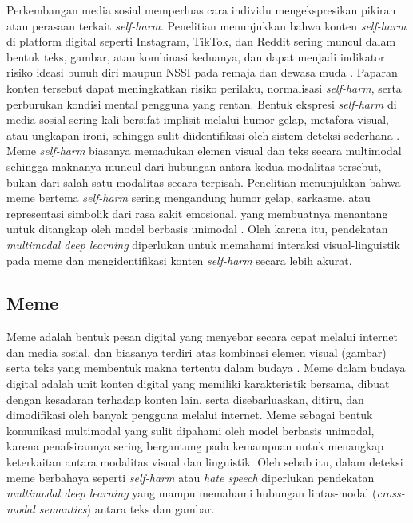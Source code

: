 Perkembangan media sosial memperluas cara individu mengekspresikan pikiran atau perasaan terkait \textit{self-harm}. Penelitian menunjukkan bahwa konten \textit{self-harm} di platform digital seperti Instagram, TikTok, dan Reddit sering muncul dalam bentuk teks, gambar, atau kombinasi keduanya, dan dapat menjadi indikator risiko ideasi bunuh diri maupun NSSI pada remaja dan dewasa muda \cite{arendt2019effects}. Paparan konten tersebut dapat meningkatkan risiko perilaku, normalisasi \textit{self-harm}, serta perburukan kondisi mental pengguna yang rentan. Bentuk ekspresi \textit{self-harm} di media sosial sering kali bersifat implisit melalui humor gelap, metafora visual, atau ungkapan ironi, sehingga sulit diidentifikasi oleh sistem deteksi sederhana \cite{Sharma2022HarmfulMemes}.
Meme \textit{self-harm} biasanya memadukan elemen visual dan teks secara multimodal sehingga maknanya muncul dari hubungan antara kedua modalitas tersebut, bukan dari salah satu modalitas secara terpisah. Penelitian menunjukkan bahwa meme bertema \textit{self-harm} sering mengandung humor gelap, sarkasme, atau representasi simbolik dari rasa sakit emosional, yang membuatnya menantang untuk ditangkap oleh model berbasis unimodal \cite{kiela2020hateful}. Oleh karena itu, pendekatan \textit{multimodal deep learning} diperlukan untuk memahami interaksi visual-linguistik pada meme dan mengidentifikasi konten \textit{self-harm} secara lebih akurat.

\subsection{Meme} \label{II.teori9}
Meme adalah bentuk pesan digital yang menyebar secara cepat melalui internet dan media sosial, dan biasanya terdiri atas kombinasi elemen visual (gambar) serta teks yang membentuk makna tertentu dalam budaya \cite{shifman2013memes}. Meme dalam budaya digital adalah unit konten digital yang memiliki karakteristik bersama, dibuat dengan kesadaran terhadap konten lain, serta disebarluaskan, ditiru, dan dimodifikasi oleh banyak pengguna melalui internet.  Meme sebagai bentuk komunikasi multimodal yang sulit dipahami oleh model berbasis unimodal, karena penafsirannya sering bergantung pada kemampuan untuk menangkap keterkaitan antara modalitas visual dan linguistik. Oleh sebab itu, dalam deteksi meme berbahaya seperti \textit{self-harm} atau \textit{hate speech} diperlukan pendekatan \textit{multimodal deep learning} yang mampu memahami hubungan lintas-modal (\textit{cross-modal semantics}) antara teks dan gambar.


